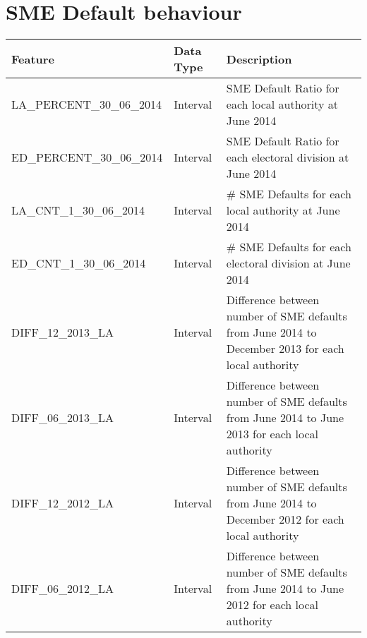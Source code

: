 
\chapter{SME Default behaviour} %

\label{AppendixF} %


\begin{table}[H]
	\centering
	\resizebox{\textwidth}{!}
	{
		\label{my-label}
		\begin{tabular}{|l|l|l|}
			\hline
			\textbf{Feature} & \textbf{Data Type} & \textbf{Description}                                                                                                                                                                                                                                                                                                                                                                                                                                                                                                                              \\ \hline
			LA\_PERCENT\_30\_06\_2014 & Interval & SME Default Ratio for each local authority at June 2014 \\ \hline
			ED\_PERCENT\_30\_06\_2014 & Interval & SME Default Ratio for each electoral division at June 2014 \\ \hline
			LA\_CNT\_1\_30\_06\_2014 & Interval & \# SME Defaults for each local authority at June 2014 \\ \hline
			ED\_CNT\_1\_30\_06\_2014 & Interval & \# SME Defaults for each electoral division at June 2014\\ \hline
			DIFF\_12\_2013\_LA & Interval & Difference between number of SME defaults from June 2014 to December 2013 for each local authority \\ \hline
			DIFF\_06\_2013\_LA & Interval & Difference between number of SME defaults from June 2014 to June 2013 for each local authority \\ \hline
			DIFF\_12\_2012\_LA & Interval & Difference between number of SME defaults from June 2014 to December 2012 for each local authority \\ \hline
			DIFF\_06\_2012\_LA & Interval & Difference between number of SME defaults from June 2014 to June 2012 for each local authority \\ \hline
			

\end{tabular}}
\end{table}
